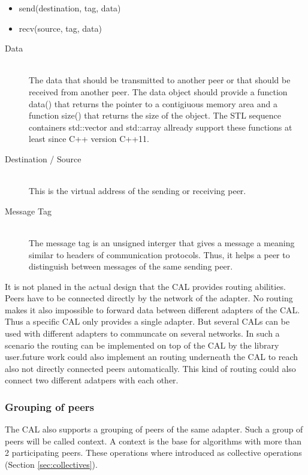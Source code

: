 \begin{itemize}
  \item send(destination, tag, data)
  \item recv(source, tag, data)
\end{itemize}

\begin{description}
\item[Data] \hfill \\
  The data that should be transmitted to
  another peer or that should be received from another peer.  The data
  object should provide a function data() that returns the pointer to a
  contigiuous memory area and a function size() that returns the size
  of the object. The STL sequence containers std::vector and
  std::array allready support these functions at least since C++ version
  C++11.
\item[Destination / Source] \hfill \\
  This is the virtual address of the sending or receiving peer.
\item[Message Tag] \hfill \\
  The message tag is an unsigned interger that gives
  a message a meaning similar to headers of communication
  protocols. Thus, it helps a peer to distinguish between messages of
  the same sending peer.
\end{description}

It is not planed in the actual design that the CAL provides routing
abilities. Peers have to be connected directly by the network of the
adapter. No routing makes it also impossible to forward data between
different adapters of the CAL. Thus a specific CAL only provides a
single adapter. But several CALs can be used with different adapters
to communcate on several networks. In such a scenario the routing can
be implemented on top of the CAL by the library user.future work could
also implement an routing underneath the CAL to reach also not
directly connected peers automatically. This kind of routing
could also connect two different adatpers with each other.
\subsubsection{Grouping of peers}
\label{sec:context}
The CAL also supports a grouping of peers of the same adapter. Such a
group of peers will be called context. A context is the base for
algorithms with more than 2 participating peers. These operations
where introduced as collective operations (Section \ref{sec:collectives}). 

